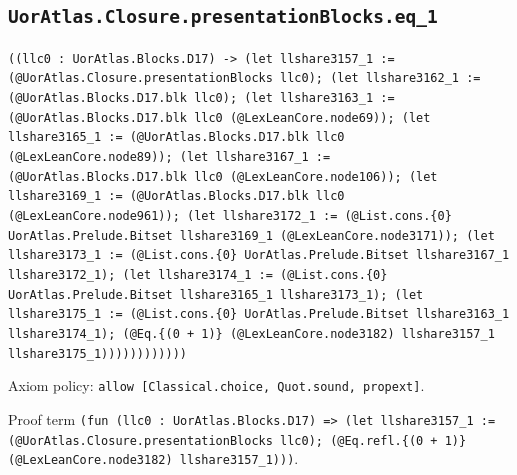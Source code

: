 \documentclass[11pt]{article}
\begin{document}
\subsection*{\texttt{UorAtlas.Closure.presentationBlocks.eq\_1}}
\noindent\texttt{((llc0 : UorAtlas.Blocks.D17) -> (let llshare3157\_1 := (@UorAtlas.Closure.presentationBlocks llc0); (let llshare3162\_1 := (@UorAtlas.Blocks.D17.blk llc0); (let llshare3163\_1 := (@UorAtlas.Blocks.D17.blk llc0 (@LexLeanCore.node69)); (let llshare3165\_1 := (@UorAtlas.Blocks.D17.blk llc0 (@LexLeanCore.node89)); (let llshare3167\_1 := (@UorAtlas.Blocks.D17.blk llc0 (@LexLeanCore.node106)); (let llshare3169\_1 := (@UorAtlas.Blocks.D17.blk llc0 (@LexLeanCore.node961)); (let llshare3172\_1 := (@List.cons.\{0\} UorAtlas.Prelude.Bitset llshare3169\_1 (@LexLeanCore.node3171)); (let llshare3173\_1 := (@List.cons.\{0\} UorAtlas.Prelude.Bitset llshare3167\_1 llshare3172\_1); (let llshare3174\_1 := (@List.cons.\{0\} UorAtlas.Prelude.Bitset llshare3165\_1 llshare3173\_1); (let llshare3175\_1 := (@List.cons.\{0\} UorAtlas.Prelude.Bitset llshare3163\_1 llshare3174\_1); (@Eq.\{(0 + 1)\} (@LexLeanCore.node3182) llshare3157\_1 llshare3175\_1))))))))))))}\par
\noindent Axiom policy: \texttt{allow [Classical.choice, Quot.sound, propext]}.\par
\noindent Proof term \texttt{(fun (llc0 : UorAtlas.Blocks.D17) => (let llshare3157\_1 := (@UorAtlas.Closure.presentationBlocks llc0); (@Eq.refl.\{(0 + 1)\} (@LexLeanCore.node3182) llshare3157\_1)))}.\par
\end{document}
